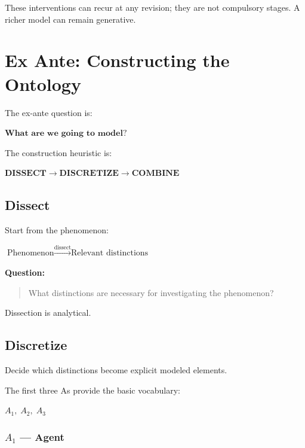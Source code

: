 \documentclass[11pt,a4paper]{article}
\newenvironment{fitdisplay}{\par\medskip\noindent\begin{lrbox}{\displaybox}$\displaystyle}{%
$\end{lrbox}\makebox[\linewidth][c]{\ifdim\wd\displaybox>\linewidth\resizebox{\linewidth}{!}{\usebox{\displaybox}}\else\usebox{\displaybox}\fi}\par\medskip}
\begin{document}
These interventions can recur at any revision; they are not compulsory stages. A richer model can remain generative.



\clearpage
\section{Ex Ante: Constructing the Ontology}

The ex-ante question is:

\begin{fitdisplay}
\boxed{\textbf{What are we going to model?}}
\end{fitdisplay}

The construction heuristic is:

\begin{fitdisplay}
\boxed{
\textbf{DISSECT}
\rightarrow
\textbf{DISCRETIZE}
\rightarrow
\textbf{COMBINE}
}
\end{fitdisplay}



\subsection{Dissect}

Start from the phenomenon:

\begin{fitdisplay}
\text{Phenomenon}
\xrightarrow{\text{dissect}}
\text{Relevant distinctions}
\end{fitdisplay}

\textbf{Question:}

\begin{quote}
What distinctions are necessary for investigating the phenomenon?
\end{quote}

Dissection is analytical.



\subsection{Discretize}

Decide which distinctions become explicit modeled elements.

The first three As provide the basic vocabulary:

\begin{fitdisplay}
\boxed{A_1,\;A_2,\;A_3}
\end{fitdisplay}

\subsubsection{\texorpdfstring{\(A_1\)}{A1} --- Agent}
\end{document}
